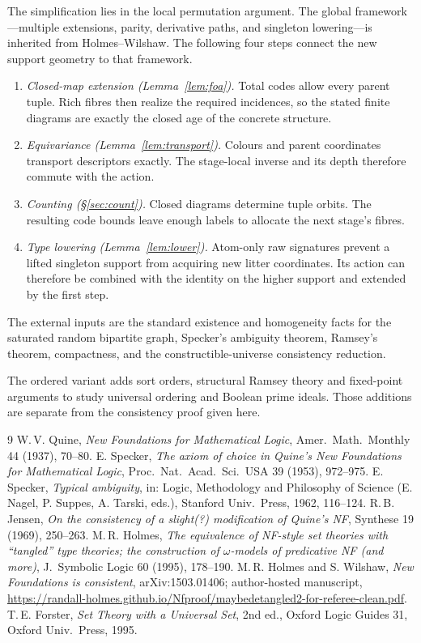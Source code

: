 \documentclass[11pt]{article}
\theoremstyle{definition}
\theoremstyle{remark}
\begin{document}
The simplification lies in the local permutation argument. The global
framework---multiple extensions, parity, derivative paths, and singleton
lowering---is inherited from Holmes--Wilshaw. The following four steps
connect the new support geometry to that framework.
\begin{enumerate}[nosep]
\item \emph{Closed-map extension (Lemma~\ref{lem:foa}).}
 Total codes allow every parent tuple. Rich fibres then realize the
 required incidences, so the stated finite diagrams are exactly the
 closed age of the concrete structure.
\item \emph{Equivariance (Lemma~\ref{lem:transport}).}
 Colours and parent coordinates transport descriptors exactly. The
 stage-local inverse and its depth therefore commute with the action.
\item \emph{Counting (\S\ref{sec:count}).}
 Closed diagrams determine tuple orbits. The resulting code bounds
 leave enough labels to allocate the next stage's fibres.
\item \emph{Type lowering (Lemma~\ref{lem:lower}).}
 Atom-only raw signatures prevent a lifted singleton support from
 acquiring new litter coordinates. Its action can therefore be combined
 with the identity on the higher support and extended by the first step.
\end{enumerate}

The external inputs are the standard existence and homogeneity facts
for the saturated random bipartite graph, Specker's ambiguity theorem,
Ramsey's theorem, compactness, and the constructible-universe consistency
reduction.

The ordered variant adds sort orders, structural Ramsey theory and
fixed-point arguments to study universal ordering and Boolean prime
ideals. Those additions are separate from the consistency proof given
here.

\begin{thebibliography}{9}
 W.\,V. Quine, \emph{New Foundations for Mathematical
Logic}, Amer.\ Math.\ Monthly 44 (1937), 70--80.
 E. Specker, \emph{The axiom of choice in Quine's New
Foundations for Mathematical Logic}, Proc.\ Nat.\ Acad.\ Sci.\ USA 39
(1953), 972--975.
 E. Specker, \emph{Typical ambiguity}, in: Logic,
Methodology and Philosophy of Science (E. Nagel, P. Suppes, A. Tarski,
eds.), Stanford Univ.\ Press, 1962, 116--124.
 R.\,B. Jensen, \emph{On the consistency of a slight(?)
modification of Quine's NF}, Synthese 19 (1969), 250--263.
 M.\,R. Holmes, \emph{The equivalence of NF-style set
theories with ``tangled'' type theories; the construction of
\(\omega\)-models of predicative NF (and more)}, J.\ Symbolic Logic 60
(1995), 178--190.
 M.\,R. Holmes and S. Wilshaw, \emph{New Foundations is
consistent}, arXiv:1503.01406; author-hosted manuscript,
\url{https://randall-holmes.github.io/Nfproof/maybedetangled2-for-referee-clean.pdf}.
 T.\,E. Forster, \emph{Set Theory with a Universal Set},
2nd ed., Oxford Logic Guides 31, Oxford Univ.\ Press, 1995.
\end{thebibliography}
\end{document}

